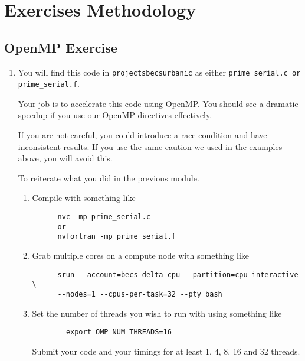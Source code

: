 \documentclass[11pt]{article}
\begin{document}
\section{Exercises Methodology}


\subsection{OpenMP Exercise}

\begin{enumerate}
  \item{You will find this code in \texttt{\/projects\/becs\/urbanic} as either \texttt{prime\_serial.c or prime\_serial.f}.
  
  Your job is to accelerate this code using OpenMP. You should see a dramatic speedup if you use our OpenMP directives effectively.
  
  If you are not careful, you could introduce a race condition and have inconsistent results. If you use the same caution we used in the examples above, you will avoid this.
  
  To reiterate what you did in the previous module.
  }
  \begin{enumerate}
    \item {Compile with something like
    \begin{verbatim}
      nvc -mp prime_serial.c
      or
      nvfortran -mp prime_serial.f
    \end{verbatim}
    }
    \item {Grab multiple cores on a compute node with something like
    \begin{verbatim}
      srun --account=becs-delta-cpu --partition=cpu-interactive \
      --nodes=1 --cpus-per-task=32 --pty bash
    \end{verbatim}
    }
    \item {Set the number of threads you wish to run with using something like
    \begin{verbatim}
        export OMP_NUM_THREADS=16
    \end{verbatim}
    }
    Submit your code and your timings for at least 1, 4, 8, 16 and 32 threads.
  \end{enumerate}

\end{enumerate}
\end{document}
